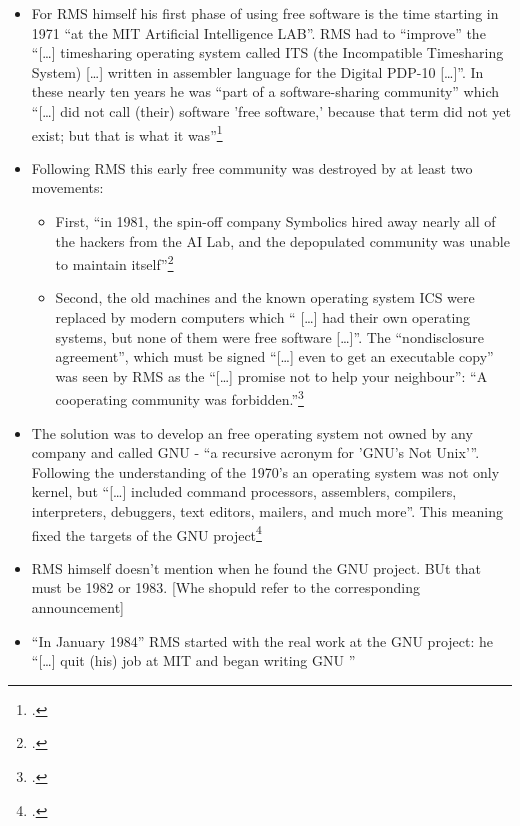 \documentclass[DIV=calc,BCOR=5mm,11pt,headings=small,oneside,abstract=true, toc=bib]{scrartcl}
\begin{document}
\begin{itemize}
  \item For RMS himself his first phase of using free software is the time
  starting in 1971 \enquote{at the MIT Artificial Intelligence LAB}. RMS had
  to \enquote{improve} the \enquote{[\ldots] timesharing operating system
  called ITS (the Incompatible Timesharing System) [\ldots] written in assembler
  language for the Digital PDP-10 [\ldots]}. In these nearly ten years he
  was \enquote{part of a software-sharing community} which \enquote{[\ldots] did
  not call (their) software ’free software,’ because that term did not yet
  exist; but that is what it was}\footcite[cf][15]{Stallman1999a}
  \item Following RMS this early free community was destroyed by at least two
  movements:
  \begin{itemize}
  	\item First, \enquote{in 1981, the spin-off company Symbolics hired away nearly
  	all of the hackers from the AI Lab, and the depopulated community was unable to
  	maintain itself}\footcite[cf][15]{Stallman1999a}
  	\item Second, the old machines and the known operating system ICS were
  	replaced by modern computers which \enquote{ [\ldots] had their own operating
  	systems, but none of them were free software [\ldots]}. The
  	\enquote{nondisclosure agreement}, which must be signed \enquote{[\ldots]
  	even to get an executable copy} was seen by RMS as the \enquote{[\ldots]
  	promise not to help your neighbour}: \enquote{A cooperating community was
  	forbidden.}\footcite[cf][16]{Stallman1999a}
  \end{itemize}
  \item The solution was to develop an free operating system not owned by any
  company and called GNU - \enquote{a recursive acronym for ’GNU’s Not
  Unix’}. Following the understanding of the 1970’s an operating system
  was not only kernel, but \enquote{[\ldots] included command processors,
  assemblers, compilers, interpreters, debuggers, text editors, mailers, and
  much more}. This meaning fixed the targets of the GNU
  project\footcite[cf][17]{Stallman1999a}
  \item RMS himself doesn’t mention when he found the GNU project. BUt that must
  be 1982 or 1983. [Whe shopuld refer to the corresponding announcement]
  \item \enquote{In January 1984} RMS started with the real work at the GNU
  project: he \enquote{[\ldots] quit (his) job at MIT and began writing GNU
}
\end{itemize}
\end{document}
